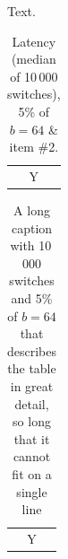 \documentclass{article}
\begin{document}
\listoftables
Text.
\begin{table}[h]
\caption{Latency (median of 10\,000 switches), 5\% of $b=64$ \& item \#2.}
\centering
\begin{tabular}{c}Y\end{tabular}
\end{table}
\begin{table}[h]
\caption{A long caption with 10\,000 switches and 5\% of $b=64$ that describes the table in great detail, so long that it cannot fit on a single line}
\centering
\begin{tabular}{c}Y\end{tabular}
\end{table}
\end{document}
